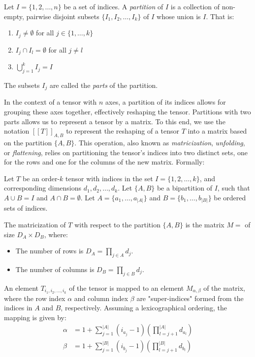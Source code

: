 \documentclass[../../main.tex]{subfiles}
\begin{document}
    \begin{definition}
        Let $I = \{1, 2, \dots, n\}$ be a set of indices. A \emph{partition} of $I$ is a collection of non-empty, pairwise disjoint subsets $\{I_1, I_2, \dots, I_k\}$ of $I$ whose union is $I$. That is:
        \begin{enumerate}
            \item $I_j \neq \emptyset$ for all $j \in \{1, \dots, k\}$
            \item $I_j \cap I_l = \emptyset$ for all $j \neq l$
            \item $\bigcup_{j=1}^k I_j = I$
        \end{enumerate}
        The subsets $I_j$ are called the \emph{parts} of the partition.
    \end{definition}

    In the context of a tensor with $n$ axes, a partition of its indices allows for grouping these axes together, effectively reshaping the tensor. Partitions with two parts allows us to represent a tensor by a matrix. To this end, we use the notation
    $[[T]]_{A,B}$
    to represent the reshaping of a tensor $T$ into a matrix based on the partition $\{A,B\}$. This operation, also known as \emph{matricization}, \emph{unfolding}, or \emph{flattening}, relies on partitioning the tensor's indices into two distinct sets, one for the rows and one for the columns of the new matrix. Formally:

    \begin{definition}
    Let $T$ be an order-$k$ tensor with indices in the set $I = \{1, 2, \dots, k\}$, and corresponding dimensions $d_1, d_2, \dots, d_k$. Let $\{A, B\}$ be a bipartition of $I$, such that $A \cup B = I$ and $A \cap B = \emptyset$. Let $A = \{a_1, \dots, a_{|A|}\}$ and $B = \{b_1, \dots, b_{|B|}\}$ be ordered sets of indices.

    The matricization of $T$ with respect to the partition $\{A, B\}$ is the matrix $M = $ of size $D_A \times D_B$, where:
    \begin{itemize}
        \item The number of rows is $D_A = \prod_{j \in A} d_j$.
        \item The number of columns is $D_B = \prod_{j \in B} d_j$.
    \end{itemize}
    An element $T_{i_1, i_2, \dots, i_k}$ of the tensor is mapped to an element $M_{\alpha, \beta}$ of the matrix, where the row index $\alpha$ and column index $\beta$ are "super-indices" formed from the indices in $A$ and $B$, respectively. Assuming a lexicographical ordering, the mapping is given by:
    \begin{align*}
        \alpha &= 1 + \sum_{j=1}^{|A|} (i_{a_j} - 1) \left( \prod_{l=j+1}^{|A|} d_{a_l} \right) \\
        \beta &= 1 + \sum_{j=1}^{|B|} (i_{b_j} - 1) \left( \prod_{l=j+1}^{|B|} d_{b_l} \right)
    \end{align*}
    \end{definition}
\end{document}
